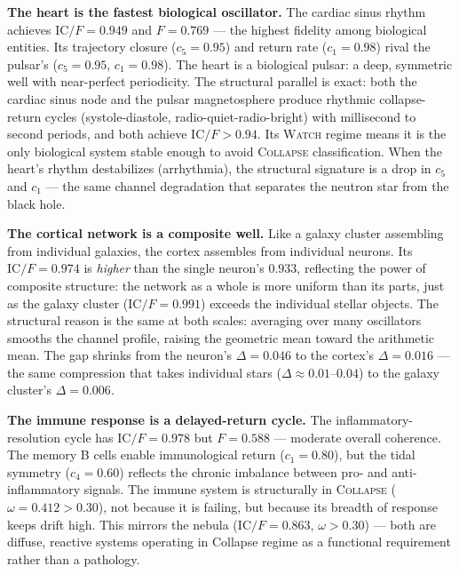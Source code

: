 \documentclass[
  aps,
  prd,
  twocolumn,
  superscriptaddress,
  nofootinbib,
  floatfix
]{revtex4-2}
\newcommand{\regime}[1]{\textsc{#1}}
\newcommand{\IC}{\mathrm{IC}}
\begin{document}
\textbf{The heart is the fastest biological oscillator.}
The cardiac sinus rhythm achieves $\IC/F = 0.949$ and
$F = 0.769$ --- the highest fidelity among biological
entities.  Its trajectory closure ($c_5 = 0.95$) and
return rate ($c_1 = 0.98$) rival the pulsar's ($c_5 = 0.95$,
$c_1 = 0.98$).  The heart is a biological pulsar: a deep,
symmetric well with near-perfect periodicity.  The structural
parallel is exact: both the cardiac sinus node and the pulsar
magnetosphere produce rhythmic collapse-return cycles
(systole-diastole, radio-quiet-radio-bright) with millisecond
to second periods, and both achieve $\IC/F > 0.94$.
Its \regime{Watch} regime means it is the only biological
system stable enough to avoid \regime{Collapse}
classification.  When the heart's rhythm destabilizes
(arrhythmia), the structural signature is a drop in $c_5$
and $c_1$ --- the same channel degradation that separates
the neutron star from the black hole.

\textbf{The cortical network is a composite well.}
Like a galaxy cluster assembling from individual galaxies,
the cortex assembles from individual neurons.  Its
$\IC/F = 0.974$ is \emph{higher} than the single neuron's
$0.933$, reflecting the power of composite structure: the
network as a whole is more uniform than its parts, just as
the galaxy cluster ($\IC/F = 0.991$) exceeds the individual
stellar objects.  The structural reason is the same at both
scales: averaging over many oscillators smooths the channel
profile, raising the geometric mean toward the arithmetic
mean.  The gap shrinks from the neuron's $\Delta = 0.046$ to
the cortex's $\Delta = 0.016$ --- the same compression that
takes individual stars ($\Delta \approx 0.01$--$0.04$) to
the galaxy cluster's $\Delta = 0.006$.

\textbf{The immune response is a delayed-return cycle.}
The inflammatory-resolution cycle has $\IC/F = 0.978$ but
$F = 0.588$ --- moderate overall coherence.  The memory B
cells enable immunological return ($c_1 = 0.80$), but the
tidal symmetry ($c_4 = 0.60$) reflects the chronic
imbalance between pro- and anti-inflammatory signals.
The immune system is structurally in \regime{Collapse}
($\omega = 0.412 > 0.30$), not because it is failing, but
because its breadth of response keeps drift high.  This
mirrors the nebula ($\IC/F = 0.863$, $\omega > 0.30$) ---
both are diffuse, reactive systems operating in Collapse
regime as a functional requirement rather than a pathology.
\end{document}
